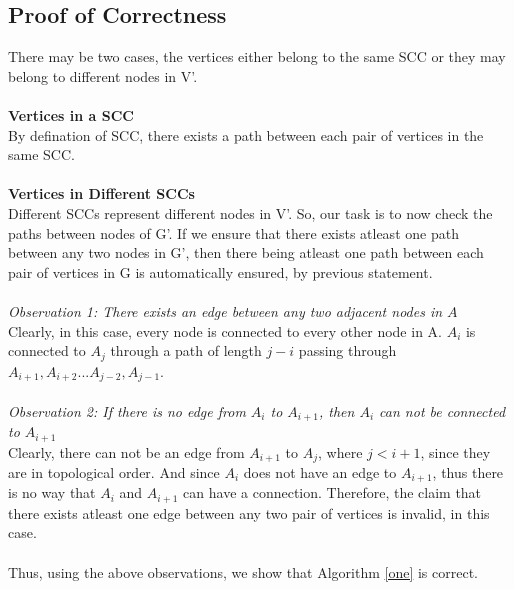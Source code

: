 \documentclass{article}
\begin{document}
\subsection{Proof of Correctness}
There may be two cases, the vertices either belong to the same SCC or they may belong to different nodes in V'.\\ \\
\textbf{Vertices in a SCC}\\
By defination of SCC, there exists a path between each pair of vertices in the same SCC. \\ \\
\textbf{Vertices in Different SCCs}\\
Different SCCs represent different nodes in V'. So, our task is to now check the paths between nodes of G'. If we ensure that there exists atleast one path between any two nodes in G', then there being atleast one path between each pair of vertices in G is automatically ensured, by previous statement. \\ \\
\emph{Observation 1: There exists an edge between any two adjacent nodes in $A$} \\
Clearly, in this case, every node is connected to every other node in A. $A_i$ is connected to $A_j$ through a path of length $j-i$ passing through $A_{i+1},A_{i+2} ... A_{j-2}, A_{j-1}$. \\ \\
\emph{Observation 2: If there is no edge from $A_i$ to $A_{i+1}$, then $A_i$ can not be connected to $A_{i+1}$} \\
Clearly, there can not be an edge from $A_{i+1}$ to $A_{j}$, where $j<i+1$, since they are in topological order. And since $A_i$ does not have an edge to $A_{i+1}$, thus there is no way that $A_i$ and $A_{i+1}$ can have a connection. Therefore, the claim that there exists atleast one edge between any two pair of vertices is invalid, in this case. \\ \\
Thus, using the above observations, we show that Algorithm \ref{one} is correct.
\end{document}
